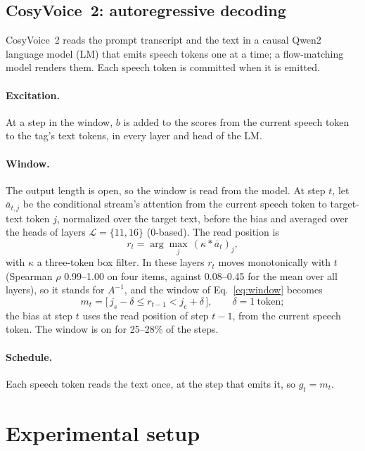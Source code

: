 \documentclass[11pt]{article}
\begin{document}
\subsection{CosyVoice~2: autoregressive decoding}
\label{sec:impl-cosy}
CosyVoice~2 \citep{du2024cosyvoice2} reads the prompt transcript and the text in a causal Qwen2 language model (LM) that emits speech tokens one at a time; a flow-matching model renders them. Each speech token is committed when it is emitted.

\paragraph{Excitation.} At a step in the window, $b$ is added to the scores from the current speech token to the tag's text tokens, in every layer and head of the LM.

\paragraph{Window.} The output length is open, so the window is read from the model. At step $t$, let $\bar a_{t,j}$ be the conditional stream's attention from the current speech token to target-text token $j$, normalized over the target text, before the bias and averaged over the heads of layers $\mathcal L = \{11, 16\}$ (0-based). The read position is
\begin{equation}
r_t = \arg\max_j\,(\kappa * \bar a_t)_j,
\label{eq:read}
\end{equation}
with $\kappa$ a three-token box filter. In these layers $r_t$ moves monotonically with $t$ (Spearman $\rho$ 0.99--1.00 on four items, against 0.08--0.45 for the mean over all layers), so it stands for $A^{-1}$, and the window of Eq.~\eqref{eq:window} becomes
\begin{equation}
m_t = \big[\,j_s - \delta \le r_{t-1} < j_e + \delta\,\big], \qquad \delta = 1\ \text{token};
\label{eq:window-cosy}
\end{equation}
the bias at step $t$ uses the read position of step $t-1$, from the current speech token. The window is on for 25--28\% of the steps.

\paragraph{Schedule.} Each speech token reads the text once, at the step that emits it, so $g_t = m_t$.

\section{Experimental setup}
\label{sec:setup}
\end{document}

